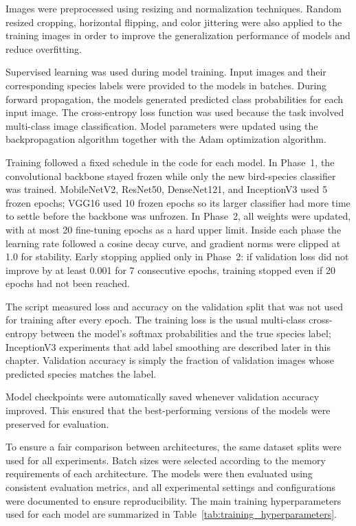 Images were preprocessed using resizing and normalization techniques. 
Random resized cropping, horizontal flipping, and color jittering were also applied to
the training images in order to improve the generalization performance of models and reduce overfitting.

Supervised learning was used during model training. Input images and their
corresponding species labels were provided to the models in batches. During
forward propagation, the models generated predicted class probabilities for
each input image. The cross-entropy loss function was used because the task 
involved multi-class image classification. Model parameters were updated using 
the backpropagation algorithm together with the Adam optimization algorithm.

Training followed a fixed schedule in the code for each model. In Phase~1, the 
convolutional backbone stayed frozen while only the new bird-species classifier was 
trained. MobileNetV2, ResNet50, DenseNet121, and InceptionV3 used 5 frozen epochs; 
VGG16 used 10 frozen epochs so its larger classifier had more time to settle before 
the backbone was unfrozen. In Phase~2, all weights were updated, with at most 20 
fine-tuning epochs as a hard upper limit. Inside each phase the learning rate followed 
a cosine decay curve, and gradient norms were clipped at 1.0 for stability. Early 
stopping applied only in Phase~2: if validation loss did not improve by at least 
0.001 for 7 consecutive epochs, training stopped even if 20 epochs had not been reached.

The script measured loss and accuracy on the validation split that was not used for training after every epoch. 
The training loss is the usual multi-class cross-entropy 
between the model's softmax probabilities and the true species label; InceptionV3 
experiments that add label smoothing are described later in this chapter. Validation 
accuracy is simply the fraction of validation images whose predicted species matches 
the label.

Model checkpoints were automatically saved whenever validation accuracy improved. This
ensured that the best-performing versions of the models were preserved for evaluation.

To ensure a fair comparison between architectures, the same dataset splits
were used for all experiments. Batch sizes were selected according to the memory requirements 
of each architecture.
The models were then evaluated using consistent evaluation metrics, and all
experimental settings and configurations were documented to ensure reproducibility.
The main training hyperparameters used for each model are summarized in
Table~\ref{tab:training_hyperparameters}.

